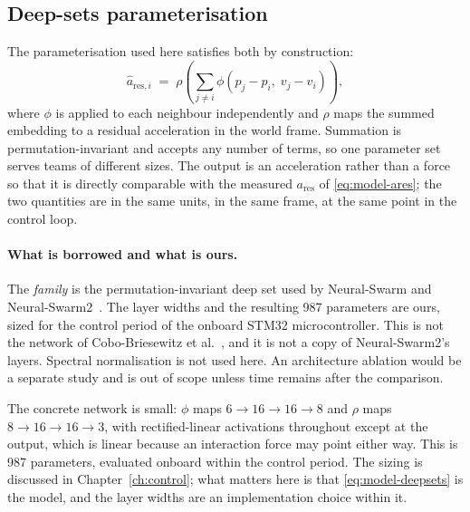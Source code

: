 \subsection{Deep-sets parameterisation}

The parameterisation used here satisfies both by construction:
%
\begin{equation}
  \hat{a}_{\mathrm{res},i}
  \;=\; \rho\!\left( \sum_{j \neq i} \phi\!\left( p_j - p_i,\; v_j - v_i \right) \right),
  \label{eq:model-deepsets}
\end{equation}
%
where $\phi$ is applied to each neighbour independently and $\rho$ maps the summed embedding to a
residual acceleration in the world frame. Summation is permutation-invariant and accepts any number
of terms, so one parameter set serves teams of different sizes. The output is an acceleration rather
than a force so that it is directly comparable with the measured $a_{\mathrm{res}}$ of
\eqref{eq:model-ares}; the two quantities are in the same units, in the same frame, at the same
point in the control loop.

\paragraph{What is borrowed and what is ours.} The \emph{family} is the permutation-invariant deep
set used by Neural-Swarm and Neural-Swarm2~\cite{shi2020neuralswarm,shi2022neuralswarm2}. The layer
widths and the resulting \num{987} parameters are ours, sized for the control period of the onboard STM32 microcontroller. This is
not the network of Cobo-Briesewitz et al.~\cite{cobobriesewitz2026lindi}, and it is not a copy of
Neural-Swarm2's layers. Spectral normalisation is not used here. An architecture ablation would be a
separate study and is out of scope unless time remains after the comparison.

The concrete network is small: $\phi$ maps $6 \rightarrow 16 \rightarrow 16 \rightarrow 8$ and
$\rho$ maps $8 \rightarrow 16 \rightarrow 16 \rightarrow 3$, with rectified-linear activations
throughout except at the output, which is linear because an interaction force may point either way.
This is \num{987} parameters, evaluated onboard within the control period. The sizing is discussed
in Chapter~\ref{ch:control}; what matters here is that \eqref{eq:model-deepsets} is the model,
and the layer widths are an implementation choice within it.

